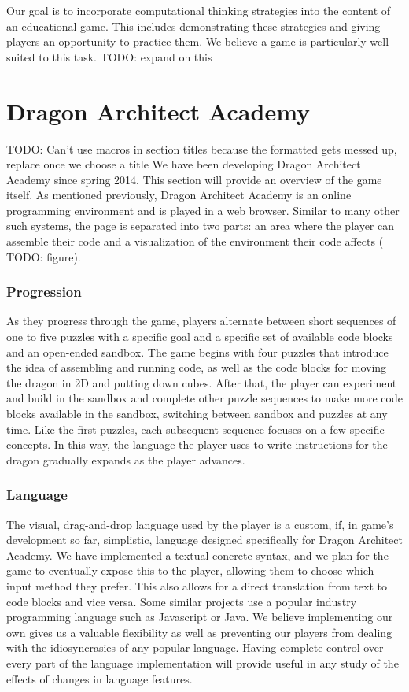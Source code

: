 \documentclass{sig-alternate}
\newcommand{\TODO}[1]{{\color{red} TODO: #1}}
\newcommand{\gametitle}{{\color{RoyalPurple} Dragon Architect Academy}}
\begin{document}
Our goal is to incorporate computational thinking strategies into the content of an educational game. This includes demonstrating these strategies and giving players an opportunity to practice them. We believe a game is particularly well suited to this task. \TODO{expand on this}


\section{\gametitle{}}
\TODO{Can't use macros in section titles because the formatted gets messed up, replace once we choose a title}
We have been developing \gametitle{} since spring 2014. This section will provide an overview of the game itself. As mentioned previously, \gametitle{} is an online programming environment and is played in a web browser. Similar to many other such systems, the page is separated into two parts: an area where the player can assemble their code and a visualization of the environment their code affects (\TODO{figure}). 

\subsubsection{Progression}

As they progress through the game, players alternate between short sequences of one to five puzzles with a specific goal and a specific set of available code blocks and an open-ended sandbox. The game begins with four puzzles that introduce the idea of assembling and running code, as well as the code blocks for moving the dragon in 2D and putting down cubes. After that, the player can experiment and build in the sandbox and complete other puzzle sequences to make more code blocks available in the sandbox, switching between sandbox and puzzles at any time. Like the first puzzles, each subsequent sequence focuses on a few specific concepts. In this way, the language the player uses to write instructions for the dragon gradually expands as the player advances.

\subsubsection{Language}

The visual, drag-and-drop language used by the player is a custom, if, in game's development so far, simplistic, language designed specifically for \gametitle{}. We have implemented a textual concrete syntax, and we plan for the game to eventually expose this to the player, allowing them to choose which input method they prefer. This also allows for a direct translation from text to code blocks and vice versa. Some similar projects use a popular industry programming language such as Javascript or Java. We believe implementing our own gives us a valuable flexibility as well as preventing our players from dealing with the idiosyncrasies of any popular language. Having complete control over every part of the language implementation will provide useful in any study of the effects of changes in language features. 
\end{document}
